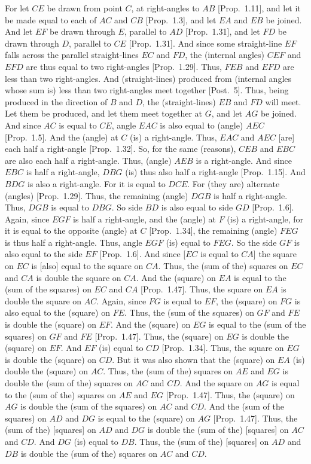 \begin{Parallel}{}{}
{For let $CE$ be drawn from point $C$, at right-angles to $AB$ [Prop.~1.11],
and let it be made equal to each of $AC$ and $CB$ [Prop.~1.3], and let $EA$ and
$EB$ be joined. And let $EF$ be drawn through $E$, parallel to $AD$
[Prop.~1.31], and let $FD$ be drawn through $D$, parallel to $CE$ [Prop.~1.31]. And since some straight-line $EF$ falls across the parallel straight-lines $EC$ and $FD$, the (internal angles) $CEF$ and $EFD$ are thus equal
to two right-angles [Prop.~1.29]. Thus, $FEB$ and $EFD$ are less than two
right-angles. And (straight-lines) produced from (internal angles whose sum is) less than
two right-angles meet together [Post.~5]. Thus, being produced in the direction of $B$
and $D$, the (straight-lines) $EB$ and $FD$ will meet. Let them be 
produced,
and let them meet together at $G$, and let $AG$ be joined.
And since $AC$ is equal to $CE$, angle $EAC$ is also equal to (angle) $AEC$ [Prop.~1.5]. And the (angle) at $C$ (is) a right-angle. Thus, $EAC$ and $AEC$
[are] each half a right-angle [Prop.~1.32]. So, for the same (reasons), $CEB$ and $EBC$ are
also each half a right-angle. Thus, (angle) $AEB$ is a right-angle.
And since $EBC$ is half a right-angle, $DBG$ (is) thus also half a right-angle
[Prop.~1.15]. And $BDG$ is also a right-angle. For it is equal to $DCE$.
For (they are) alternate (angles) [Prop.~1.29].
Thus, the remaining (angle) $DGB$ is half a right-angle. Thus,
$DGB$ is equal to $DBG$. So side $BD$ is also equal to side $GD$ [Prop.~1.6].
Again, 
since $EGF$ is  half a right-angle, and the (angle) at $F$ (is) a right-angle,
for it is equal to the opposite (angle) at $C$
[Prop.~1.34], the remaining
(angle) $FEG$ is thus half a right-angle. Thus, angle $EGF$ (is) equal to $FEG$.
So the side $GF$ is also equal to the side $EF$ [Prop.~1.6].
And since [$EC$ is equal to $CA$] the square on $EC$ is [also] equal to the
square on $CA$. Thus, the (sum of the) squares on $EC$ and $CA$ is 
double the square on $CA$. And the (square) on $EA$ is equal to the (sum of the
squares) on $EC$ and $CA$ [Prop.~1.47]. Thus, the square on $EA$ is double the
square on $AC$. Again, since $FG$ is equal to $EF$, the (square) on $FG$ is also
equal to the (square) on $FE$. Thus, the (sum of the squares) on $GF$ and
$FE$ is double the (square) on $EF$. And the (square) on $EG$ is equal to
the (sum of the squares) on  $GF$ and $FE$ [Prop.~1.47]. Thus, the (square)
on $EG$ is double the (square) on $EF$. And $EF$ (is) equal to $CD$  [Prop.~1.34].
Thus, the square on $EG$ is double the (square) on $CD$. But it was also
shown that the (square) on $EA$ (is) double the (square) on $AC$. Thus,
the (sum of the) squares on $AE$ and $EG$ is double the (sum of the) squares
on $AC$ and $CD$. And the square on $AG$ is equal to the (sum of the) squares
on $AE$ and $EG$ [Prop.~1.47]. Thus, the (square) on $AG$ is double the (sum of the squares) on $AC$ and $CD$. And the (sum of the squares) on $AD$ and $DG$ 
is equal to the (square) on $AG$  [Prop.~1.47].
Thus, the (sum of the) [squares] on $AD$ and $DG$ is double the
(sum of the) [squares] on $AC$ and $CD$. And $DG$ (is) equal to $DB$.
Thus, the (sum of the) [squares] on $AD$ and $DB$ is double the
(sum of the) squares on $AC$ and $CD$. 

}
\end{Parallel}
